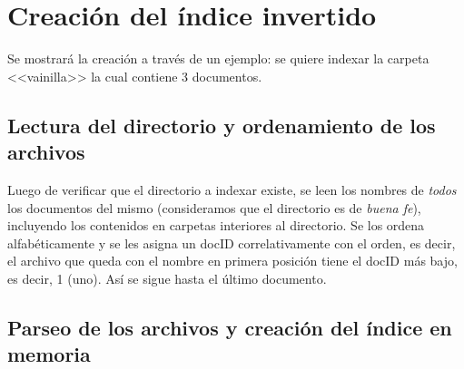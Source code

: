 \section{Creación del índice invertido}

Se mostrará la creación a través de un ejemplo: se quiere indexar la carpeta <<vainilla>> la cual contiene 3 documentos.


\subsection{Lectura del directorio y ordenamiento de los archivos}

Luego de verificar que el directorio a indexar existe, se leen los nombres de \textit{todos} los documentos del mismo (consideramos que el directorio es de \textit{buena fe}), incluyendo los contenidos en carpetas interiores al directorio. Se los ordena alfabéticamente y se les asigna un docID correlativamente con el orden, es decir, el archivo que queda con el nombre en primera posición tiene el docID más bajo, es decir, 1 (uno). Así se sigue hasta el último documento.

\subsection{Parseo de los archivos y creación del índice en memoria}

